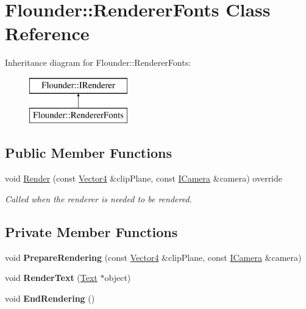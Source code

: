 \hypertarget{class_flounder_1_1_renderer_fonts}{}\section{Flounder\+:\+:Renderer\+Fonts Class Reference}
\label{class_flounder_1_1_renderer_fonts}
Inheritance diagram for Flounder\+:\+:Renderer\+Fonts\+:\begin{figure}[H]
\begin{center}
\leavevmode
\includegraphics[height=2.000000cm]{class_flounder_1_1_renderer_fonts}
\end{center}
\end{figure}
\subsection*{Public Member Functions}
\begin{DoxyCompactItemize}
\item 
void \hyperlink{class_flounder_1_1_renderer_fonts_a98049021a5e71c025ee9d38a23e07454}{Render} (const \hyperlink{class_flounder_1_1_vector4}{Vector4} \&clip\+Plane, const \hyperlink{class_flounder_1_1_i_camera}{I\+Camera} \&camera) override
\begin{DoxyCompactList}\small\item\em Called when the renderer is needed to be rendered. \end{DoxyCompactList}\end{DoxyCompactItemize}
\subsection*{Private Member Functions}
\begin{DoxyCompactItemize}
\item 
\mbox{\label{class_flounder_1_1_renderer_fonts_ae1aa76603ca61a994baf4653c5c4dcc6}} 
void {\bfseries Prepare\+Rendering} (const \hyperlink{class_flounder_1_1_vector4}{Vector4} \&clip\+Plane, const \hyperlink{class_flounder_1_1_i_camera}{I\+Camera} \&camera)
\item 
\mbox{\label{class_flounder_1_1_renderer_fonts_af72a54a6c0f44f217150cbeae2a7af4e}} 
void {\bfseries Render\+Text} (\hyperlink{class_flounder_1_1_text}{Text} $\ast$object)
\item 
\mbox{\label{class_flounder_1_1_renderer_fonts_ad503a98b0aadb07036f3981870a7a7cc}} 
void {\bfseries End\+Rendering} ()
\end{DoxyCompactItemize}
